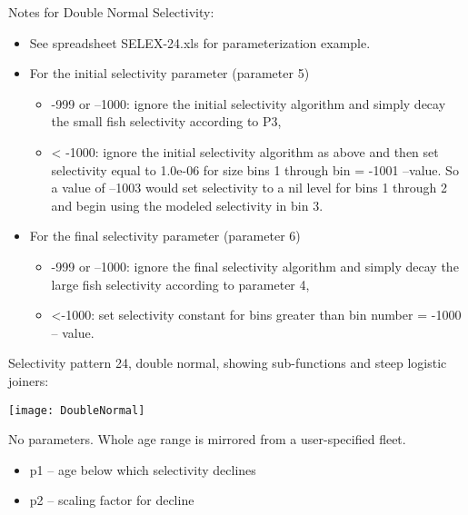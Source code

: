 Notes for Double Normal Selectivity:
	\begin{itemize}
		\item See spreadsheet SELEX-24.xls for parameterization example.
		\item For the initial selectivity parameter (parameter 5)
		\begin{itemize}
			\item -999 or –1000:   ignore the initial selectivity algorithm and simply decay the small fish selectivity according to P3,
			\item < -1000:  ignore the initial selectivity algorithm as above and then set selectivity equal to 1.0e-06 for size bins 1 through bin =  -1001 –value.  So a value of –1003 would set selectivity to a nil level for bins 1 through 2 and begin using the modeled selectivity in bin 3.
		\end{itemize}
		\item For the final selectivity parameter (parameter 6)
		\begin{itemize}
			\item -999 or –1000:   ignore the final selectivity algorithm and simply decay the large fish selectivity according to parameter 4,
			\item <-1000:  set selectivity constant for bins greater than bin number =  -1000 – value.
		\end{itemize}
	\end{itemize}
Selectivity pattern 24, double normal, showing sub-functions and steep logistic joiners:
	\begin{center}
		\texttt{[image: DoubleNormal]}
	\end{center}

No parameters.  Whole age range is mirrored from a user-specified fleet.

	\begin{itemize}
		\item p1 – age below which selectivity declines
		\item p2 – scaling factor for decline
	\end{itemize}

